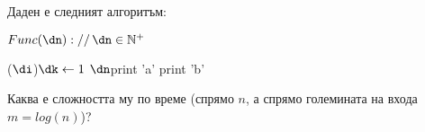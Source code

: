 \begin{problem}
	Даден е следният алгоритъм:
	\begin{pseudocode}
		
		$Func(\dn)://\,\dn\in\mathbb{N}^+$
		\Mybegin
		{
			{
				{
					\If{$\dj<\dn$}
					{
						\Myfor(\Withstep $\di$){$\dk\leftarrow1$ \KwTo $\dn$}{print 'a'\;}
					}
					print 'b'\;
				}
				
				
				
			}
		}
	\end{pseudocode}
	Каква е сложността му по време (спрямо $n$, а спрямо големината на входа $m=log(n)$)?
\end{problem}
